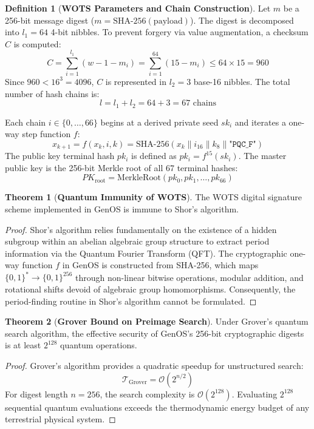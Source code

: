 \documentclass[10pt,journal,compsoc]{IEEEtran}
\theoremstyle{definition}
\newtheorem{definition}{Definition}
\newtheorem{theorem}{Theorem}
\begin{document}
\begin{definition}[\textbf{WOTS Parameters and Chain Construction}]
Let $m$ be a 256-bit message digest ($m = \text{SHA-256}(\text{payload})$). The digest is decomposed into $l_1 = 64$ 4-bit nibbles. To prevent forgery via value augmentation, a checksum $C$ is computed:
$$C = \sum_{i=1}^{l_1} (w - 1 - m_i) = \sum_{i=1}^{64} (15 - m_i) \le 64 \times 15 = 960$$
Since $960 < 16^3 = 4096$, $C$ is represented in $l_2 = 3$ base-16 nibbles. The total number of hash chains is:
$$l = l_1 + l_2 = 64 + 3 = 67 \text{ chains}$$
\end{definition}

Each chain $i \in \{0, \dots, 66\}$ begins at a derived private seed $sk_i$ and iterates a one-way step function $f$:
$$x_{k+1} = f(x_k, i, k) = \text{SHA-256}(x_k \parallel i_{16} \parallel k_8 \parallel \texttt{"PQC\_F"})$$
The public key terminal hash $pk_i$ is defined as $pk_i = f^{15}(sk_i)$. The master public key is the 256-bit Merkle root of all 67 terminal hashes:
$$PK_{\text{root}} = \text{MerkleRoot}(pk_0, pk_1, \dots, pk_{66})$$

\begin{theorem}[\textbf{Quantum Immunity of WOTS}]
The WOTS digital signature scheme implemented in GenOS is immune to Shor's algorithm.
\end{theorem}
\begin{proof}
Shor's algorithm relies fundamentally on the existence of a hidden subgroup within an abelian algebraic group structure to extract period information via the Quantum Fourier Transform (QFT). The cryptographic one-way function $f$ in GenOS is constructed from SHA-256, which maps $\{0,1\}^* \to \{0,1\}^{256}$ through non-linear bitwise operations, modular addition, and rotational shifts devoid of algebraic group homomorphisms. Consequently, the period-finding routine in Shor's algorithm cannot be formulated.
\end{proof}

\begin{theorem}[\textbf{Grover Bound on Preimage Search}]
Under Grover's quantum search algorithm, the effective security of GenOS's 256-bit cryptographic digests is at least $2^{128}$ quantum operations.
\end{theorem}
\begin{proof}
Grover's algorithm provides a quadratic speedup for unstructured search:
$$\mathcal{T}_{\text{Grover}} = \mathcal{O}\left(2^{n/2}\right)$$
For digest length $n = 256$, the search complexity is $\mathcal{O}(2^{128})$. Evaluating $2^{128}$ sequential quantum evaluations exceeds the thermodynamic energy budget of any terrestrial physical system.
\end{proof}
\end{document}
